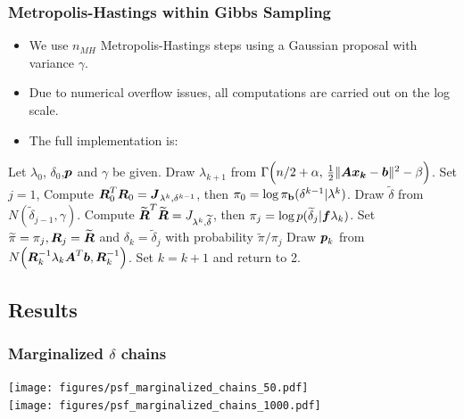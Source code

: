\documentclass[]{beamer}
\renewcommand{\tilde}{\widetilde}
\newcommand{\bm}[1]{\mbox{\boldmath$#1$}}
\newcommand{\vect}[1]{\bm{#1}}
\begin{document}
\begin{frame}[t]
  \frametitle{Metropolis-Hastings within Gibbs Sampling}
  {\footnotesize
  \begin{itemize}
    \itemsep 1.1em
    \item We use $n_{MH}$ \alert{Metropolis-Hastings} steps using a Gaussian proposal with variance $\gamma$.
    \item Due to numerical overflow issues, all computations are carried out on the log scale.
    \item The full implementation is:
  \end{itemize}
  \begin{algorithmic}[1]
  \STATE Let $\lambda_0$, $\delta_0$,$\vect p$ and $\gamma$ be given.
  \STATE Draw $\lambda_{k+1}$ from $\Gamma \Big(n/2+\alpha,\,\frac12\|\vect{Ax_k} - \vect b\|^2 - \beta \Big)$.
  \STATE Set $j = 1$, Compute \alert{$\vect R_0^T \vect R_0  = \vect J_{\lambda^k,\delta^{k-1}}$, then $\pi_0 = \log \pi_{\mathbf b}(\delta^{k-1}|\lambda^k)$}.
    \STATE Draw $\tilde \delta$ from $N(\tilde \delta_{j-1}, \gamma)$.
    \STATE Compute \alert{$\tilde{\vect R}^T\tilde{\vect R} = J_{\lambda^k,\tilde \delta}$, then $\pi_j = \log p(\tilde \delta_j|\vect f \lambda _k)$}.
    \STATE Set $\tilde \pi = \pi_j, \vect R_j = \tilde{\vect R}$ and $\delta_{k} = \tilde \delta_j$ with probability $\tilde \pi/\pi_j$
  \ENDFOR
  \STATE Draw $\vect p_k$ from $N\Big( \vect R_k^{-1}\lambda_k \vect A^T\vect b, \vect R_k^{-1} \Big)$.
  \STATE Set $k=k+1$ and return to 2.
  \end{algorithmic}
  }
\end{frame}

\subsection{Results}

\begin{frame}[t]
  \frametitle{Marginalized $\delta$ chains}
  \vspace{-1.2em}
  \begin{center}
    \texttt{[image: figures/psf\_marginalized\_chains\_50.pdf]}\\
    \texttt{[image: figures/psf\_marginalized\_chains\_1000.pdf]}\\ 
  \end{center}
\end{frame}
\end{document}

